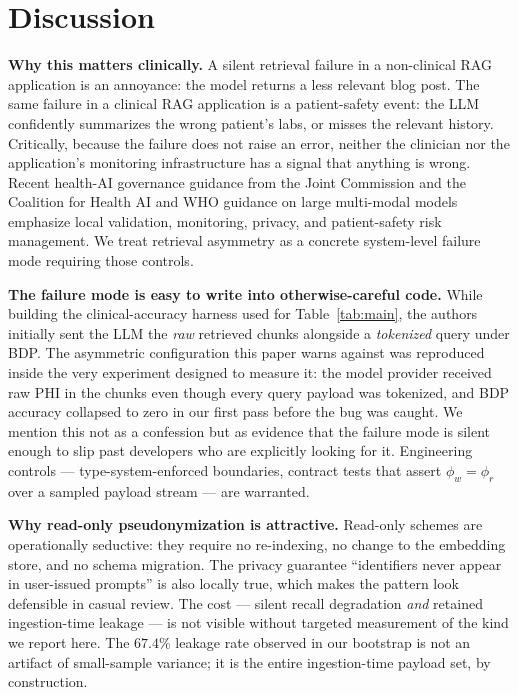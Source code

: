 \documentclass[11pt,a4paper]{article}
\begin{document}
\section{Discussion}

\textbf{Why this matters clinically.} A silent retrieval failure in a
non-clinical RAG application is an annoyance: the model returns a less
relevant blog post. The same failure in a clinical RAG application is a
patient-safety event: the LLM confidently summarizes the wrong patient's
labs, or misses the relevant history. Critically, because the failure does
not raise an error, neither the clinician nor the application's monitoring
infrastructure has a signal that anything is wrong. Recent health-AI
governance guidance from the Joint Commission and the Coalition for Health
AI \cite{jc_chai_2025} and WHO guidance on large multi-modal models
\cite{who_lmm_2024} emphasize local validation, monitoring, privacy, and
patient-safety risk management. We treat retrieval asymmetry as a concrete
system-level failure mode requiring those controls.

\textbf{The failure mode is easy to write into otherwise-careful code.}
While building the clinical-accuracy harness used for Table~\ref{tab:main},
the authors initially sent the LLM the \emph{raw} retrieved chunks
alongside a \emph{tokenized} query under BDP. The asymmetric configuration
this paper warns against was reproduced inside the very experiment designed
to measure it: the model provider received raw PHI in the chunks even
though every query payload was tokenized, and BDP accuracy collapsed to
zero in our first pass before the bug was caught. We mention this not as a
confession but as evidence that the failure mode is silent enough to slip
past developers who are explicitly looking for it. Engineering controls ---
type-system-enforced boundaries, contract tests that assert
$\phi_w = \phi_r$ over a sampled payload stream --- are warranted.

\textbf{Why read-only pseudonymization is attractive.} Read-only schemes
are operationally seductive: they require no re-indexing, no change to the
embedding store, and no schema migration. The privacy guarantee
``identifiers never appear in user-issued prompts'' is also locally true,
which makes the pattern look defensible in casual review. The cost ---
silent recall degradation \emph{and} retained ingestion-time leakage --- is
not visible without targeted measurement of the kind we report here. The
$67.4\%$ leakage rate observed in our bootstrap is not an artifact of
small-sample variance; it is the entire ingestion-time payload set, by
construction.
\end{document}
